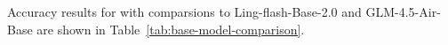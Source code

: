 Accuracy results for \ourbasemodel with comparsions to Ling-flash-Base-2.0 and GLM-4.5-Air-Base are shown in Table~\ref{tab:base-model-comparison}.

